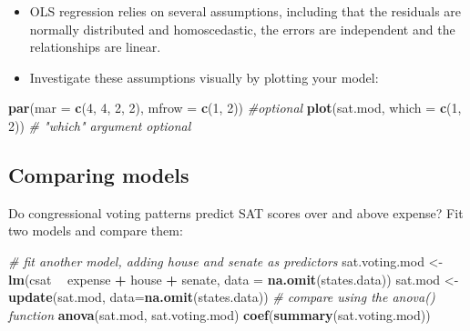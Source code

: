 \documentclass[]{book}
\newenvironment{Shaded}{\begin{snugshade}}{\end{snugshade}}
\newcommand{\KeywordTok}[1]{\textcolor[rgb]{0.13,0.29,0.53}{\textbf{#1}}}
\newcommand{\DataTypeTok}[1]{\textcolor[rgb]{0.13,0.29,0.53}{#1}}
\newcommand{\DecValTok}[1]{\textcolor[rgb]{0.00,0.00,0.81}{#1}}
\newcommand{\StringTok}[1]{\textcolor[rgb]{0.31,0.60,0.02}{#1}}
\newcommand{\CommentTok}[1]{\textcolor[rgb]{0.56,0.35,0.01}{\textit{#1}}}
\newcommand{\OperatorTok}[1]{\textcolor[rgb]{0.81,0.36,0.00}{\textbf{#1}}}
\newcommand{\NormalTok}[1]{#1}
\providecommand{\tightlist}{%
  \setlength{\itemsep}{0pt}\setlength{\parskip}{0pt}}
\begin{document}
\begin{itemize}
\tightlist
\item
  OLS regression relies on several assumptions, including that the
  residuals are normally distributed and homoscedastic, the errors are
  independent and the relationships are linear.
\item
  Investigate these assumptions visually by plotting your model:
\end{itemize}

\begin{Shaded}
\begin{Highlighting}[]
  \KeywordTok{par}\NormalTok{(}\DataTypeTok{mar =} \KeywordTok{c}\NormalTok{(}\DecValTok{4}\NormalTok{, }\DecValTok{4}\NormalTok{, }\DecValTok{2}\NormalTok{, }\DecValTok{2}\NormalTok{), }\DataTypeTok{mfrow =} \KeywordTok{c}\NormalTok{(}\DecValTok{1}\NormalTok{, }\DecValTok{2}\NormalTok{)) }\CommentTok{#optional}
  \KeywordTok{plot}\NormalTok{(sat.mod, }\DataTypeTok{which =} \KeywordTok{c}\NormalTok{(}\DecValTok{1}\NormalTok{, }\DecValTok{2}\NormalTok{)) }\CommentTok{# "which" argument optional}
\end{Highlighting}
\end{Shaded}

\subsection{Comparing models}\label{comparing-models}

Do congressional voting patterns predict SAT scores over and above
expense? Fit two models and compare them:

\begin{Shaded}
\begin{Highlighting}[]
  \CommentTok{# fit another model, adding house and senate as predictors}
\NormalTok{  sat.voting.mod <-}\StringTok{  }\KeywordTok{lm}\NormalTok{(csat }\OperatorTok{~}\StringTok{ }\NormalTok{expense }\OperatorTok{+}\StringTok{ }\NormalTok{house }\OperatorTok{+}\StringTok{ }\NormalTok{senate,}
                        \DataTypeTok{data =} \KeywordTok{na.omit}\NormalTok{(states.data))}
\NormalTok{  sat.mod <-}\StringTok{ }\KeywordTok{update}\NormalTok{(sat.mod, }\DataTypeTok{data=}\KeywordTok{na.omit}\NormalTok{(states.data))}
  \CommentTok{# compare using the anova() function}
  \KeywordTok{anova}\NormalTok{(sat.mod, sat.voting.mod)}
  \KeywordTok{coef}\NormalTok{(}\KeywordTok{summary}\NormalTok{(sat.voting.mod))}
\end{Highlighting}
\end{Shaded}
\end{document}
